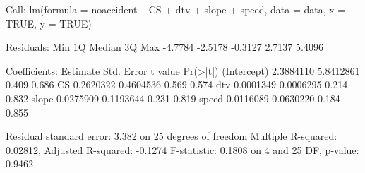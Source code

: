 Call:
lm(formula = noaccident ~ CS + dtv + slope + speed, data = data, x = TRUE, y = TRUE)

Residuals:
    Min      1Q  Median      3Q     Max 
-4.7784 -2.5178 -0.3127  2.7137  5.4096 

Coefficients:
             Estimate Std. Error t value Pr(>|t|)
(Intercept) 2.3884110  5.8412861   0.409    0.686
CS          0.2620322  0.4604536   0.569    0.574
dtv         0.0001349  0.0006295   0.214    0.832
slope       0.0275909  0.1193644   0.231    0.819
speed       0.0116089  0.0630220   0.184    0.855

Residual standard error: 3.382 on 25 degrees of freedom
Multiple R-squared:  0.02812,	Adjusted R-squared:  -0.1274 
F-statistic: 0.1808 on 4 and 25 DF,  p-value: 0.9462